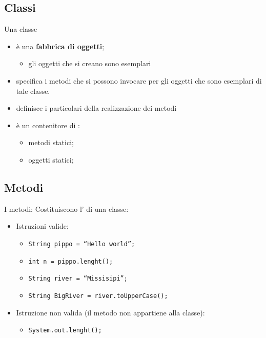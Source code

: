 \subsection*{Classi}
\begin{frame}
\begin{block}{Una classe}
\begin{itemize}
\item è una \textbf{fabbrica di oggetti};
\begin{itemize}
\item gli oggetti che si creano sono \alert{esemplari}
\end{itemize}
\item specifica i metodi che si possono invocare per gli oggetti che sono esemplari di tale classe.
\item definisce i particolari della realizzazione dei metodi
\item è un contenitore di :
\begin{itemize}
\item metodi statici;
\item oggetti statici;
\end{itemize}
\end{itemize}
\end{block}
\end{frame}

\subsection*{Metodi}
\begin{frame}
\begin{block}{I metodi:}
Costituiscono l' di una classe:
\begin{itemize}
\item Istruzioni valide:
\begin{itemize}
\item \texttt{String pippo = ``Hello world'';}
\item \texttt{int n = pippo.\alert{lenght()};}
\item \texttt{String river = ``Missisipi'';}
\item \texttt{String BigRiver = river.\alert{toUpperCase();}}
\end{itemize}
\item Istruzione non valida (il metodo non appartiene alla classe):
\begin{itemize}
\item \texttt{System.out\alert{.lenght();}}
\end{itemize}
\end{itemize}
\end{block}
\end{frame}


